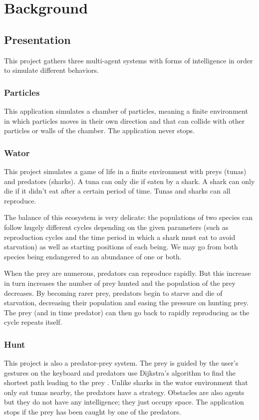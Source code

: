 \chapter{Background}
\thispagestyle{document}
\section{Presentation}
	This project gathers three multi-agent systems with forms of intelligence in order to simulate different behaviors.
	
	\subsection{Particles}
	This application simulates a chamber of particles, meaning a finite environment in which particles moves in their own direction and that can collide with other particles or walls of the chamber. The application never stops.
	
	\subsection{Wator}
	This project simulates a game of life in a finite environment with preys (tunas) and predators (sharks). A tuna can only die if eaten by a shark. A shark can only die if it didn't eat after a certain period of time. Tunas and sharks can all reproduce.
	
	The balance of this ecosystem is very delicate: the populations of two species can follow hugely different cycles depending on the given parameters (such as reproduction cycles and the time period in which a shark must eat to avoid starvation) as well as starting positions of each being. We may go from both species being endangered to an abundance of one or both.

When the prey are numerous, predators can reproduce rapidly. But this increase in turn increases the number of prey hunted and the population of the prey decreases. By becoming rarer prey, predators begin to starve and die of starvation, decreasing their population and easing the pressure on hunting prey. The prey (and in time predator) can then go back to rapidly reproducing as the cycle repeats itself.
	\subsection{Hunt}
	
	This project is also a predator-prey system. The prey is guided by the user's gestures on the keyboard and predators use Dijkstra's algorithm to find the shortest path leading to the prey \cite{dijkstra}. Unlike sharks in the wator environment that only eat tunas nearby, the predators have a strategy. Obstacles are also agents but they do not have any intelligence; they just occupy space. The application stops if the prey has been caught by one of the predators.
	
